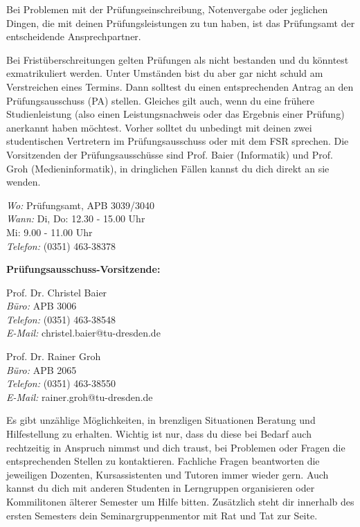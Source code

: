 \newpage

\label{sec:pruefungsamt}
Bei Problemen mit der Prüfungseinschreibung, Notenvergabe oder jeglichen Dingen, die mit deinen Prüfungsleistungen zu tun haben, ist das Prüfungsamt der entscheidende Ansprechpartner.

Bei Fristüberschreitungen gelten Prüfungen als nicht bestanden und du könntest exmatrikuliert werden.
Unter Umständen bist du aber gar nicht schuld am Verstreichen eines Termins.
Dann solltest du einen entsprechenden Antrag an den Prüfungsausschuss (PA) stellen.
Gleiches gilt auch, wenn du eine frühere Studienleistung (also einen Leistungsnachweis oder das Ergebnis einer Prüfung) anerkannt haben möchtest.
Vorher solltet du unbedingt mit deinen zwei studentischen Vertretern im Prüfungsausschuss oder mit dem FSR sprechen.
Die Vorsitzenden der Prüfungsausschüsse sind Prof. Baier (Informatik) und Prof. Groh (Medieninformatik), in dringlichen Fällen kannst du dich direkt an sie wenden.

\textit{Wo:} Prüfungsamt, APB 3039/3040 \\
\textit{Wann:} Di, Do: 12.30 - 15.00 Uhr \\
Mi: 9.00 - 11.00 Uhr \\
\textit{Telefon:} (0351) 463-38378

\textbf{Prüfungsausschuss-Vorsitzende:}

\begin{multicols}{2}
Prof. Dr. Christel Baier \\
\textit{Büro:} APB 3006 \\
\textit{Telefon:} (0351) 463-38548 \\
\textit{E-Mail:} christel.baier@tu-dresden.de

Prof. Dr. Rainer Groh \\
\textit{Büro:} APB 2065 \\
\textit{Telefon:} (0351) 463-38550 \\
\textit{E-Mail:} rainer.groh@tu-dresden.de
\end{multicols}

Es gibt unzählige Möglichkeiten, in brenzligen Situationen Beratung und Hilfestellung zu erhalten.
Wichtig ist nur, dass du diese bei Bedarf auch rechtzeitig in Anspruch nimmst und dich traust, bei Problemen oder Fragen die entsprechenden Stellen zu kontaktieren.
Fachliche Fragen beantworten die jeweiligen Dozenten, Kursassistenten und Tutoren immer wieder gern.
Auch kannst du dich mit anderen Studenten in Lerngruppen organisieren oder Kommilitonen älterer Semester um Hilfe bitten.
Zusätzlich steht dir innerhalb des ersten Semesters dein Seminargruppenmentor mit Rat und Tat zur Seite.
